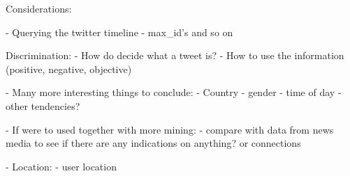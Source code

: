 \documentclass[Main]{subfiles}
\begin{document}
Considerations:



- Querying the twitter timeline
    - max_id's and so on



Discrimination:
- How do decide what a tweet is?
- How to use the information (positive, negative, objective)





- Many more interesting things to conclude:
    - Country
    - gender
    - time of day
    - other tendencies?
    
- If were to used together with more mining:
    - compare with data from news media to see if there are any indications on anything? or connections


- Location:
    - user location
\end{document}
